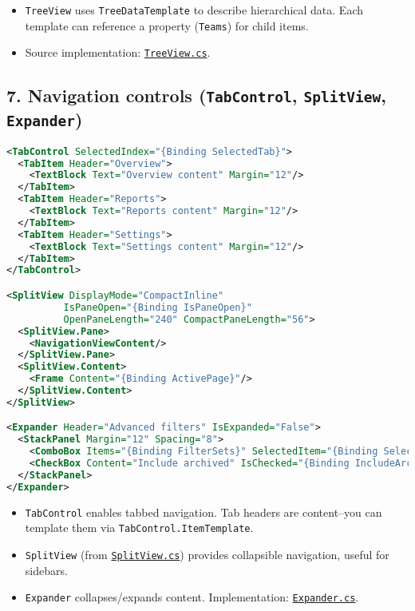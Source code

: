\begin{itemize}
\tightlist
\item
  \passthrough{\lstinline!TreeView!} uses
  \passthrough{\lstinline!TreeDataTemplate!} to describe hierarchical
  data. Each template can reference a property
  (\passthrough{\lstinline!Teams!}) for child items.
\item
  Source implementation:
  \href{https://github.com/AvaloniaUI/Avalonia/blob/master/src/Avalonia.Controls/TreeView.cs}{\passthrough{\lstinline!TreeView.cs!}}.
\end{itemize}

\subsection{\texorpdfstring{7. Navigation controls (\texttt{TabControl},
\texttt{SplitView},
\texttt{Expander})}{7. Navigation controls (TabControl, SplitView, Expander)}}\label{navigation-controls-tabcontrol-splitview-expander}

\begin{lstlisting}[language=XML]
<TabControl SelectedIndex="{Binding SelectedTab}">
  <TabItem Header="Overview">
    <TextBlock Text="Overview content" Margin="12"/>
  </TabItem>
  <TabItem Header="Reports">
    <TextBlock Text="Reports content" Margin="12"/>
  </TabItem>
  <TabItem Header="Settings">
    <TextBlock Text="Settings content" Margin="12"/>
  </TabItem>
</TabControl>

<SplitView DisplayMode="CompactInline"
          IsPaneOpen="{Binding IsPaneOpen}"
          OpenPaneLength="240" CompactPaneLength="56">
  <SplitView.Pane>
    <NavigationViewContent/>
  </SplitView.Pane>
  <SplitView.Content>
    <Frame Content="{Binding ActivePage}"/>
  </SplitView.Content>
</SplitView>

<Expander Header="Advanced filters" IsExpanded="False">
  <StackPanel Margin="12" Spacing="8">
    <ComboBox Items="{Binding FilterSets}" SelectedItem="{Binding SelectedFilter}"/>
    <CheckBox Content="Include archived" IsChecked="{Binding IncludeArchived}"/>
  </StackPanel>
</Expander>
\end{lstlisting}

\begin{itemize}
\tightlist
\item
  \passthrough{\lstinline!TabControl!} enables tabbed navigation. Tab
  headers are content--you can template them via
  \passthrough{\lstinline!TabControl.ItemTemplate!}.
\item
  \passthrough{\lstinline!SplitView!} (from
  \href{https://github.com/AvaloniaUI/Avalonia/blob/master/src/Avalonia.Controls/SplitView/SplitView.cs}{\passthrough{\lstinline!SplitView.cs!}})
  provides collapsible navigation, useful for sidebars.
\item
  \passthrough{\lstinline!Expander!} collapses/expands content.
  Implementation:
  \href{https://github.com/AvaloniaUI/Avalonia/blob/master/src/Avalonia.Controls/Expander.cs}{\passthrough{\lstinline!Expander.cs!}}.
\end{itemize}

